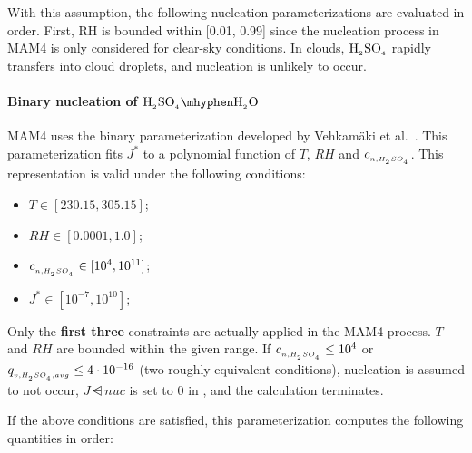 With this assumption, the following nucleation parameterizations are evaluated
in order. First, RH is bounded within [0.01, 0.99] since the nucleation process
in MAM4 is only considered for clear-sky conditions. In clouds, $\rm H_{_2}SO_{_4}$
rapidly transfers into cloud droplets, and nucleation is unlikely to occur.

\paragraph{Binary nucleation of $\rsag \mhyphen \rwater$}

MAM4 uses the binary parameterization developed by
Vehkam\"aki et al.~\citep{vehkamaki-2002-jgr}. This parameterization fits $J^*$
to a polynomial function of $T$, $RH$ and $c_{_{n,H_{_2}SO_{_4}}}$. This representation
is valid under the following conditions:

\begin{itemize}
  \item $T \in [230.15, 305.15]$;
  \item $RH \in [0.0001, 1.0]$;
  \item $c_{_{n,H_{_2}SO_{_4}}} \in [10^4, 10^{11}]$;
  \item $J^* \in [10^{-7}, 10^{10}]$;
\end{itemize}

Only the \textbf{first three} constraints are actually applied in the MAM4
process. $T$ and $RH$ are bounded within the given range. If
$c_{_{n,H_{_2}SO_{_4}}} \le 10^4$ or $q_{_{v,H_{_2}SO_{_4},avg}} \le 4 \cdot 10^{-16}$
(two roughly equivalent conditions), nucleation is assumed to not occur,
$J\dsub{nuc}$ is set to $0$ in , and the calculation
terminates.

If the above conditions are satisfied, this parameterization computes the
following quantities in order:

